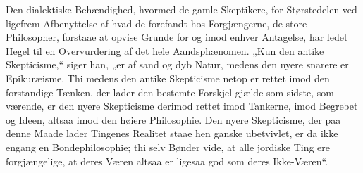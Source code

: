 \documentclass[12pt]{book}
\newcommand{\opage}[1]{\marginnote{\footnotesize\textit{[#1]}}}
\begin{document}
Den dialektiske Behændighed, hvormed de gamle Skeptikere, for Størstedelen ved ligefrem Afbenyttelse af hvad de forefandt hos Forgjængerne, de store Philosopher, forstaae at opvise Grunde for og imod enhver Antagelse, har ledet Hegel til en Overvurdering af det hele Aandsphænomen. „Kun den antike Skepticisme,“ siger han, „er af sand og dyb Natur, medens den nyere snarere er Epikuræisme. Thi medens den antike Skepticisme netop er rettet imod den forstandige Tænken, der lader den bestemte Forskjel gjælde som sidste, som værende, er den nyere Skepticisme derimod rettet imod Tankerne, imod
\opage{218}Begrebet og Ideen, altsaa imod den høiere Philosophie. Den nyere Skepticisme, der paa denne Maade lader Tingenes Realitet staae hen ganske ubetvivlet, er da ikke engang en Bondephilosophie; thi selv Bønder vide, at alle jordiske Ting ere forgjængelige, at deres Væren altsaa er ligesaa god som deres Ikke-Væren“.
\end{document}
